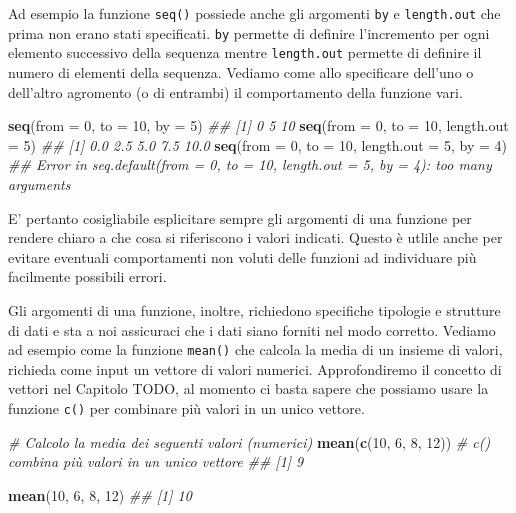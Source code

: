 \documentclass[
]{book}
\newenvironment{Shaded}{\begin{snugshade}}{\end{snugshade}}
\newcommand{\CommentTok}[1]{\textcolor[rgb]{0.56,0.35,0.01}{\textit{#1}}}
\newcommand{\DataTypeTok}[1]{\textcolor[rgb]{0.13,0.29,0.53}{#1}}
\newcommand{\DecValTok}[1]{\textcolor[rgb]{0.00,0.00,0.81}{#1}}
\newcommand{\KeywordTok}[1]{\textcolor[rgb]{0.13,0.29,0.53}{\textbf{#1}}}
\newcommand{\NormalTok}[1]{#1}
\begin{document}
Ad esempio la funzione \texttt{seq()} possiede anche gli argomenti \texttt{by} e \texttt{length.out} che prima non erano stati specificati. \texttt{by} permette di definire l'incremento per ogni elemento successivo della sequenza mentre \texttt{length.out} permette di definire il numero di elementi della sequenza. Vediamo come allo specificare dell'uno o dell'altro agromento (o di entrambi) il comportamento della funzione vari.

\begin{Shaded}
\begin{Highlighting}[]
\KeywordTok{seq}\NormalTok{(}\DataTypeTok{from =} \DecValTok{0}\NormalTok{,  }\DataTypeTok{to =} \DecValTok{10}\NormalTok{, }\DataTypeTok{by =} \DecValTok{5}\NormalTok{)}
\CommentTok{## [1]  0  5 10}
\KeywordTok{seq}\NormalTok{(}\DataTypeTok{from =} \DecValTok{0}\NormalTok{,  }\DataTypeTok{to =} \DecValTok{10}\NormalTok{, }\DataTypeTok{length.out =} \DecValTok{5}\NormalTok{)}
\CommentTok{## [1]  0.0  2.5  5.0  7.5 10.0}
\KeywordTok{seq}\NormalTok{(}\DataTypeTok{from =} \DecValTok{0}\NormalTok{,  }\DataTypeTok{to =} \DecValTok{10}\NormalTok{, }\DataTypeTok{length.out =} \DecValTok{5}\NormalTok{, }\DataTypeTok{by =} \DecValTok{4}\NormalTok{)}
\CommentTok{## Error in seq.default(from = 0, to = 10, length.out = 5, by = 4): too many arguments}
\end{Highlighting}
\end{Shaded}

E' pertanto cosigliabile esplicitare sempre gli argomenti di una funzione per rendere chiaro a che cosa si riferiscono i valori indicati. Questo è utlile anche per evitare eventuali comportamenti non voluti delle funzioni ad individuare più facilmente possibili errori.

Gli argomenti di una funzione, inoltre, richiedono specifiche tipologie e strutture di dati e sta a noi assicuraci che i dati siano forniti nel modo corretto. Vediamo ad esempio come la funzione \texttt{mean()} che calcola la media di un insieme di valori, richieda come input un vettore di valori numerici. Approfondiremo il concetto di vettori nel Capitolo TODO, al momento ci basta sapere che possiamo usare la funzione \texttt{c()} per combinare più valori in un unico vettore.

\begin{Shaded}
\begin{Highlighting}[]
\CommentTok{# Calcolo la media dei seguenti valori (numerici)}
\KeywordTok{mean}\NormalTok{(}\KeywordTok{c}\NormalTok{(}\DecValTok{10}\NormalTok{, }\DecValTok{6}\NormalTok{, }\DecValTok{8}\NormalTok{, }\DecValTok{12}\NormalTok{)) }\CommentTok{# c() combina più valori in un unico vettore}
\CommentTok{## [1] 9}

\KeywordTok{mean}\NormalTok{(}\DecValTok{10}\NormalTok{, }\DecValTok{6}\NormalTok{, }\DecValTok{8}\NormalTok{, }\DecValTok{12}\NormalTok{)}
\CommentTok{## [1] 10}
\end{Highlighting}
\end{Shaded}
\end{document}
